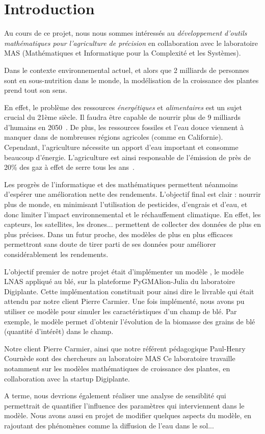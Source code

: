 \section{Introduction}


Au cours de ce projet, nous nous sommes intéressés au \emph{développement d'outils mathématiques 
pour l'agriculture de précision} en collaboration avec le laboratoire MAS (Mathématiques et Informatique pour la Complexité et les Systèmes).

Dans le contexte environnemental actuel, et alors que 2 milliards de personnes sont en sous-nutrition dans le monde, la modélisation de la croissance des plantes prend tout son sens.

En effet, le problème des ressources \textit{énergétiques} et \textit{alimentaires} est un sujet crucial du  21ème siècle.
Il faudra être capable de nourrir plus de 
9 milliards d'humains en 2050~\cite{wiki:popu_mondiale}.
De plus, les ressources fossiles et l'eau douce viennent à manquer dans de nombreuses régions agricoles (comme en Californie). Cependant, l'agriculture nécessite un apport d'eau important et consomme beaucoup d'énergie. L'agriculture est ainsi responsable de l'émission de près de 20\% des gaz à effet de serre tous les ans~\cite{GES}.

Les progrès de l'informatique et des mathématiques permettent néanmoins d'espérer une amélioration nette des rendements. L'objectif final est clair : nourrir plus de monde, en minimisant l'utilisation de pesticides, d'engrais et d'eau, et donc limiter l'impact environnemental et le réchauffement climatique. En effet, les capteurs, les satellites, les drones... permettent de collecter des données de plus en plus précises. Dans un futur proche, des modèles de plus en plus efficaces permettront sans doute de tirer parti de ses données pour améliorer considérablement les rendements.  

L'objectif premier de notre projet était d'implémenter un modèle , le modèle LNAS appliqué au blé, sur la plateforme PyGMAlion-Julia du laboratoire Digiplante. Cette implémentation constituait pour ainsi dire le livrable qui était attendu par notre client Pierre Carmier.
Une fois implémenté, nous avons pu utiliser ce modèle pour simuler les caractéristiques d'un champ de blé. Par exemple, le modèle permet d'obtenir l'évolution de la biomasse des grains de blé (quantité d'intérêt) dans le champ.

Notre client Pierre Carmier, ainsi que notre référent pédagogique Paul-Henry Cournède sont des chercheurs au laboratoire MAS
Ce laboratoire travaille notamment sur les modèles mathématiques de
croissance des plantes, en collaboration avec la startup Digiplante.

A terme, nous devrions également réaliser une analyse de sensiblité qui permettrait de quantifier l'influence des paramètres qui interviennent dans le modèle. Nous avons aussi en projet de modifier quelques aspects du modèle, en rajoutant des phénomènes comme la diffusion de l'eau dans le sol...
